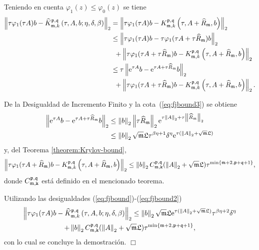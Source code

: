 Teniendo en cuenta $\varphi_1(z) \leq \varphi_0(z)$ se tiene
\begin{align}
	\left\lVert \tau \varphi_1(\tau A)b -\widehat{K}_{\mathfrak{m},k}^{\mathfrak{p},\mathfrak{q}}\left( \tau, A , b; \eta, \delta, \beta \right) \right\rVert_2 & = \left\lVert \tau \varphi_1(\tau A)b -K_{\mathfrak{m},k}^{\mathfrak{p},\mathfrak{q}}\left( \tau, A+\widehat{R}_{\mathfrak{m}} , b \right) \right\rVert_2 \nonumber \\
	& \leq \left\lVert \tau \varphi_1(\tau A)b - \tau \varphi_1(\tau A + \tau \widehat{R}_{\mathfrak{m}})b \right\rVert_2 \nonumber \\
	& \enspace + \left\lVert \tau \varphi_1(\tau A + \tau \widehat{R}_{\mathfrak{m}})b-K_{\mathfrak{m},k}^{\mathfrak{p},\mathfrak{q}}\left( \tau, A+\widehat{R}_{\mathfrak{m}} , b \right) \right\rVert_2 \nonumber\\
	& \leq \tau \left\lVert \mathrm{e}^{\tau A}b - \mathrm{e}^{\tau A + \tau \widehat{R}_{\mathfrak{m}}}b \right\rVert_2 \nonumber \\
	& \enspace + \left\lVert \tau \varphi_1(\tau A + \tau \widehat{R}_{\mathfrak{m}})b-K_{\mathfrak{m},k}^{\mathfrak{p},\mathfrak{q}}\left( \tau, A+\widehat{R}_{\mathfrak{m}} , b \right) \right\rVert_2. \label{eq:fjbound}
\end{align}

De la Desigualdad de Incremento Finito y la cota~(\ref{eq:fjbound3}) se obtiene
\begin{align}
	\left\lVert \mathrm{e}^{\tau A}b - \mathrm{e}^{\tau A + \tau \widehat{R}_{\mathfrak{m}}}b \right\rVert_2&\leq \left\lVert b \right\rVert_2 \left\lVert \tau \widehat{R}_{\mathfrak{m}} \right\rVert_2\mathrm{e}^{\tau\left\lVert A \right\rVert_2+\tau\left\lVert \widehat{R}_{\mathfrak{m}} \right\rVert_2} \\ &\leq \left\lVert b \right\rVert_2   \sqrt{\mathfrak{m}}\mathfrak{L} \tau^{\beta\eta+1}\delta^\eta\mathrm{e}^{\tau(\left\lVert A \right\rVert_2+\sqrt{\mathfrak{m}}\mathfrak{L})} \nonumber\label{eq:fjbound1}
\end{align}
y, del Teorema \ref{theorem:Krylov-bound}, 
\vspace{-0.25cm}
\begin{equation}
	\left\lVert \tau \varphi_1(\tau A+\widehat{R}_{\mathfrak{m}})b-K_{\mathfrak{m},k}^{\mathfrak{p},\mathfrak{q}}\left( \tau, A+\widehat{R}_{\mathfrak{m}} , b \right) \right\rVert_2  \leq \left\lVert b \right\rVert_2C_{\mathfrak{m},\mathtt{k}}^{\mathfrak{p},\mathfrak{q}}(\left\lVert A \right\rVert_2+\sqrt{\mathfrak{m}}\mathfrak{L})\tau^{\min\{\mathfrak{m}+2,\mathfrak{p}+\mathfrak{q}+1\}}, \label{eq:fjbound2}
\end{equation}
donde $C_{\mathfrak{m},\mathtt{k}}^{\mathfrak{p},\mathfrak{q}}$ está definido en el mencionado teorema.

Utilizando las desigualdades (\ref{eq:fjbound})-(\ref{eq:fjbound2})
\vspace{-0.25cm}
\begin{multline*}
	\left\lVert \tau \varphi_1(\tau A)b -\widehat{K}_{\mathfrak{m},k}^{\mathfrak{p},\mathfrak{q}}\left( \tau, A , b; \eta, \delta, \beta \right) \right\rVert_2 \leq 
	\left\lVert b \right\rVert_2 \sqrt{\mathfrak{m}}\mathfrak{L} \mathrm{e}^{\tau(\left\lVert A \right\rVert_2+\sqrt{\mathfrak{m}}\mathfrak{L})} \tau^{\beta\eta+2}\delta^\eta \\ + \left\lVert b \right\rVert_2C_{\mathfrak{m},\mathtt{k}}^{\mathfrak{p},\mathfrak{q}}(\left\lVert A \right\rVert_2+\sqrt{\mathfrak{m}}\mathfrak{L})\tau^{\min\{\mathfrak{m}+2,\mathfrak{p}+\mathfrak{q}+1\}} ,
\end{multline*}
con lo cual se concluye la demostración. $\Box$\\

